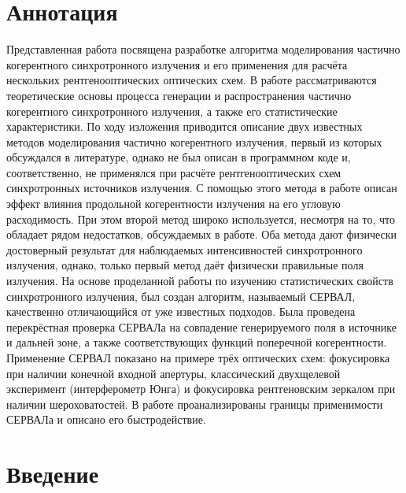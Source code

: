 \chapter*{Аннотация }							%
Представленная работа посвящена разработке алгоритма моделирования частично когерентного синхротронного излучения и его применения для расчёта нескольких рентгенооптических оптических схем. В работе рассматриваются теоретические основы процесса генерации и распространения частично когерентного синхротронного излучения, а также его статистические характеристики. По ходу изложения приводится описание двух известных методов моделирования частично когерентного излучения, первый из которых обсуждался в литературе, однако не был описан в программном коде и, соответственно, не применялся при расчёте рентгенооптических схем синхротронных источников излучения. С помощью этого метода в работе описан эффект влияния продольной когерентности излучения на его угловую расходимость. При этом второй метод широко используется, несмотря на то, что обладает рядом недостатков, обсуждаемых в работе. Оба метода дают физически достоверный результат для наблюдаемых интенсивностей синхротронного излучения, однако, только первый метод даёт физически правильные поля излучения. На основе проделанной работы по изучению статистических свойств синхротронного излучения, был создан алгоритм, называемый СЕРВАЛ, качественно отличающийся от уже известных подходов. Была проведена перекрёстная проверка СЕРВАЛа на совпадение генерируемого поля в источнике и дальней зоне, а также соответствующих функций поперечной когерентности. Применение СЕРВАЛ показано на примере трёх оптических схем: фокусировка при наличии конечной входной апертуры, классический двухщелевой эксперимент (интерферометр Юнга) и фокусировка рентгеновским зеркалом при наличии шероховатостей. В работе проанализированы границы применимости СЕРВАЛа и описано его быстродействие.
\chapter*{Введение}							%

\newcommand{\actuality}{Актуальность}
\newcommand{\aim}{\textbf{Целью}}
\newcommand{\tasks}{Задачи}
\newcommand{\defpositions}{\textbf{Основные положения, выносимые на~защиту:}}
\newcommand{\novelty}{\textbf{Научная новизна}}
\newcommand{\influence}{\textbf{Научная и практическая значимость}}
\newcommand{\reliability}{\textbf{Степень достоверности}}
\newcommand{\probation}{\textbf{Апробация работы.}}
\newcommand{\contribution}{\textbf{Личный вклад.}}
\newcommand{\publications}{\textbf{Публикации.}}

